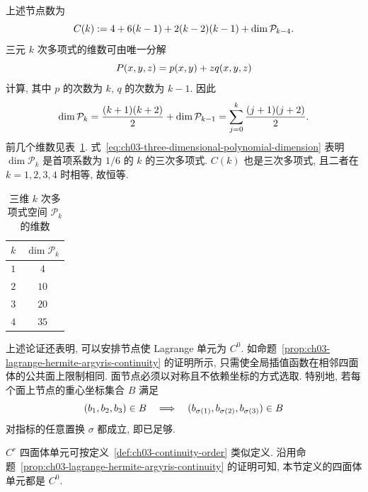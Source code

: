 上述节点数为
\begin{equation}
\MathBookFormulaID{formula-ch03-tetrahedral-node-count}
\label{eq:ch03-tetrahedral-node-count}
C(k):=4+6(k-1)+2(k-2)(k-1)+\dim\mathcal P_{k-4}.
\end{equation}
三元 $k$ 次多项式的维数可由唯一分解
\begin{equation}
\MathBookFormulaID{formula-ch03-three-dimensional-polynomial-decomposition}
\label{eq:ch03-three-dimensional-polynomial-decomposition}
P(x,y,z)=p(x,y)+zq(x,y,z)
\end{equation}
计算, 其中 $p$ 的次数为 $k$, $q$ 的次数为 $k-1$. 因此
\begin{equation}
\MathBookFormulaID{formula-ch03-three-dimensional-polynomial-dimension}
\label{eq:ch03-three-dimensional-polynomial-dimension}
\dim\mathcal P_k=\frac{(k+1)(k+2)}2+\dim\mathcal P_{k-1}
=\sum_{j=0}^k\frac{(j+1)(j+2)}2.
\end{equation}
前几个维数见表~\ref{tab:ch03-three-dimensional-polynomial-dimension}. 式~\eqref{eq:ch03-three-dimensional-polynomial-dimension} 表明 $\dim\mathcal P_k$ 是首项系数为 $1/6$ 的 $k$ 的三次多项式. $C(k)$ 也是三次多项式, 且二者在 $k=1,2,3,4$ 时相等, 故恒等.
\begin{table}[htbp]
\centering
\caption{三维 $k$ 次多项式空间 $\mathcal P_k$ 的维数}
\label{tab:ch03-three-dimensional-polynomial-dimension}
\begin{tabular}{c|c}
$k$&$\dim\mathcal P_k$\\\hline
$1$&$4$\\
$2$&$10$\\
$3$&$20$\\
$4$&$35$
\end{tabular}
\end{table}

上述论证还表明, 可以安排节点使 Lagrange 单元为 $C^0$. 如命题~\ref{prop:ch03-lagrange-hermite-argyris-continuity} 的证明所示, 只需使全局插值函数在相邻四面体的公共面上限制相同. 面节点必须以对称且不依赖坐标的方式选取. 特别地, 若每个面上节点的重心坐标集合 $B$ 满足
\[
\MathBookFormulaID{formula-ch03-face-barycentric-symmetry}
(b_1,b_2,b_3)\in B\quad\Longrightarrow\quad
(b_{\sigma(1)},b_{\sigma(2)},b_{\sigma(3)})\in B
\]
对指标的任意置换 $\sigma$ 都成立, 即已足够.

\setcounter{thmcount}{3}
\begin{Remark}
\label{rem:ch03-tetrahedral-continuity}
$C^r$ 四面体单元可按定义~\ref{def:ch03-continuity-order} 类似定义. 沿用命题~\ref{prop:ch03-lagrange-hermite-argyris-continuity} 的证明可知, 本节定义的四面体单元都是 $C^0$.
\end{Remark}

